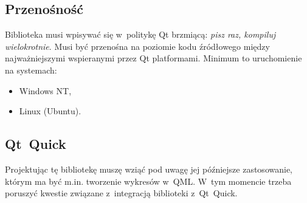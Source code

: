 
\subsection{Przenośność}
Biblioteka musi wpisywać się w~politykę Qt brzmiącą: \textit{pisz raz, kompiluj wielokrotnie}. Musi być przenośna na poziomie kodu źródłowego między najważniejszymi wspieranymi przez Qt platformami.
Minimum to uruchomienie na systemach:
\begin{itemize}
\item{Windows NT,}
\item{Linux (Ubuntu).}
\end{itemize}



\subsection{Qt~Quick}
Projektując tę bibliotekę muszę wziąć pod uwagę jej późniejsze zastosowanie, którym ma być m.in. tworzenie wykresów w~QML. W~tym momencie trzeba poruszyć kwestie związane z~integracją biblioteki z~Qt~Quick.
